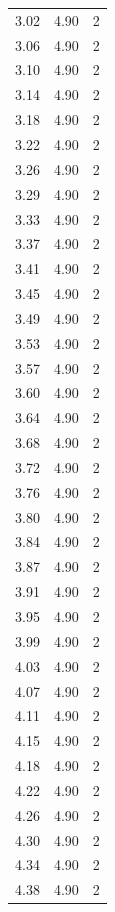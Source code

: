 \begin{longtable}{lrr}
  3.02 & 4.90 & 2 \\
  3.06 & 4.90 & 2 \\
  3.10 & 4.90 & 2 \\
  3.14 & 4.90 & 2 \\
  3.18 & 4.90 & 2 \\
  3.22 & 4.90 & 2 \\
  3.26 & 4.90 & 2 \\
  3.29 & 4.90 & 2 \\
  3.33 & 4.90 & 2 \\
  3.37 & 4.90 & 2 \\
  3.41 & 4.90 & 2 \\
  3.45 & 4.90 & 2 \\
  3.49 & 4.90 & 2 \\
  3.53 & 4.90 & 2 \\
  3.57 & 4.90 & 2 \\
  3.60 & 4.90 & 2 \\
  3.64 & 4.90 & 2 \\
  3.68 & 4.90 & 2 \\
  3.72 & 4.90 & 2 \\
  3.76 & 4.90 & 2 \\
  3.80 & 4.90 & 2 \\
  3.84 & 4.90 & 2 \\
  3.87 & 4.90 & 2 \\
  3.91 & 4.90 & 2 \\
  3.95 & 4.90 & 2 \\
  3.99 & 4.90 & 2 \\
  4.03 & 4.90 & 2 \\
  4.07 & 4.90 & 2 \\
  4.11 & 4.90 & 2 \\
  4.15 & 4.90 & 2 \\
  4.18 & 4.90 & 2 \\
  4.22 & 4.90 & 2 \\
  4.26 & 4.90 & 2 \\
  4.30 & 4.90 & 2 \\
  4.34 & 4.90 & 2 \\
  4.38 & 4.90 & 2 \\
\end{longtable}
